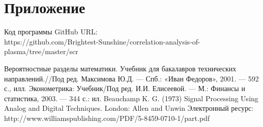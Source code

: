 \documentclass{article}
\begin{document}
\section{Приложение}
\noindent Код программы GitHub URL:\\
\newline https://github.com/Brightest-Sunshine/correlation-analysis-of-plasma/tree/master/scr

\begin{thebibliography}{9}
 Вероятностные разделы математики. Учебник для бакалавров технических направлений.//Под ред. Максимова Ю.Д. — Спб.: «Иван Федоров», 2001. — 592 с., илл.
 Эконометрика: Учебник/Под ред. И.И. Елисеевой. — М.: Финансы и статистика, 2003. — 344 с.: ил.
 Beauchamp K. G. (1973) Signal Processing Using Analog and Digital Techniques. London: Allen and
Unwin
 Электронный ресурс: http://www.williamspublishing.com/PDF/5-8459-0710-1/part.pdf

\end{thebibliography}
\end{document}
